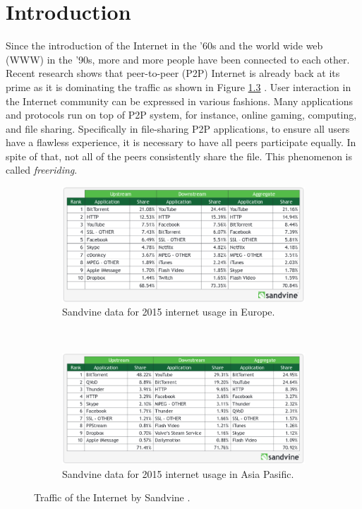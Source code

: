 \chapter{Introduction}
\label{chp:introduction}
Since the introduction of the Internet in the '60s and the world wide web (WWW) in the '90s, more and more people have been connected to each other. Recent research shows that peer-to-peer (P2P) Internet is already back at its prime as it is dominating the traffic as shown in Figure \ref{fig:usage} \cite{2015:internettraffic:sandvine}. User interaction in the Internet community can be expressed in various fashions. Many applications and protocols run on top of P2P system, for instance, online gaming, computing, and file sharing. Specifically in file-sharing P2P applications, to ensure all users have a flawless experience, it is necessary to have all peers participate equally. In spite of that, not all of the peers consistently share the file. This phenomenon is called \textit{freeriding}.

\begin{figure}[h]
	\centering
	\begin{subfigure}[b]{0.8\textwidth}
		\includegraphics[width=\linewidth]{pics/sandvineeu2015}
		\caption{Sandvine data for 2015 internet usage in Europe.}
		\label{fig:usage1}
	\end{subfigure}\\
	\begin{subfigure}[b]{0.8\textwidth}
		\includegraphics[width=\linewidth]{pics/sandvineasia2015}
		\caption{Sandvine data for 2015 internet usage in Asia Pasific.}
		\label{fig:usage2}
	\end{subfigure}%
	\caption{Traffic of the Internet by Sandvine \cite{2015:internettraffic:sandvine}.}
	\label{fig:usage}
\end{figure}

